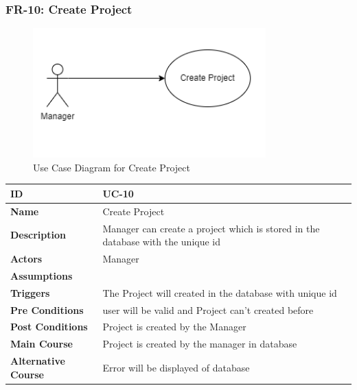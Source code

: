     \subsubsection{FR-10: Create Project}
    \begin{figure}[H]
        \includegraphics[height=5cm, width=0.8\textwidth]{./diagrams/Use Case/u10.png}
        \centering 
        \caption{Use Case Diagram for Create Project}
        \label{fig:Usecase1}
        \end{figure}
        
    \begin{center}
        \begin{tabularx}{\textwidth}{|l|X|}
            \hline
            \textbf{ID} & UC-10 \\
            \hline
            \textbf{Name} & Create Project \\
            \hline
            \textbf{Description} & Manager can create a project which is stored in the database with the unique id \\
            \hline
            \textbf{Actors} & Manager \\
            \hline
            \textbf{Assumptions} &  \\
            \hline
            \textbf{Triggers} & The Project will created in the database with unique id \\
            \hline
            \textbf{Pre Conditions} & user will be valid and Project can't created before  \\
            \hline
            \textbf{Post Conditions} & Project is created by the Manager \\
            \hline
            \textbf{Main Course} & Project is created by the manager in database \\
            \hline
            \textbf{Alternative Course} & Error will be displayed of database  \\
            \hline
            
        \end{tabularx}
    \end{center}
    
